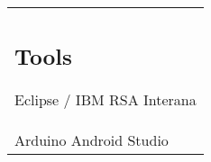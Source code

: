 \documentclass[]{jackie_loven_resume}
\begin{document}
\begin{minipage}[t]{0.33\textwidth}
\begin{tabular}{|p{10cm}}
\subsection{Tools}
Eclipse \// IBM RSA \textbullet{} Interana \\
Arduino \textbullet{} Android Studio
\end{tabular}
\sectionsep




%
%

\end{minipage} 
\hfill
\end{document}
